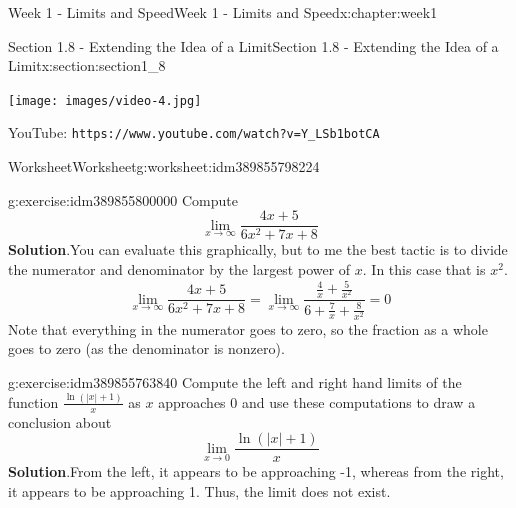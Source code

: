\documentclass[oneside,10pt,]{book}
\newcommand{\blocktitlefont}{\relax}
\newcommand{\mono}[1]{\texttt{#1}}
\numberwithin{equation}{section}
\newlength{\qrsize}
\newlength{\previewwidth}
\begin{document}
\begin{chapterptx}{Week 1 - Limits and Speed}{}{Week 1 - Limits and Speed}{}{}{x:chapter:week1}
\begin{sectionptx}{Section 1.8 - Extending the Idea of a Limit}{}{Section 1.8 - Extending the Idea of a Limit}{}{}{x:section:section1_8}
\begin{tcbraster}[raster columns=2, raster column skip=1pt, raster halign=center, raster force size=false, raster left skip=0pt, raster right skip=0pt]
\begin{tcolorbox}[previewstyle, width=\previewwidth]%
\texttt{[image: images/video-4.jpg]}%
\end{tcolorbox}%
\begin{tcolorbox}[qrstyle]%
{\hypersetup{urlcolor=black}}%
\end{tcolorbox}%
\begin{tcolorbox}[captionstyle]%
\small YouTube: \mono{https://www.youtube.com/watch?v=Y\_LSb1botCA}\end{tcolorbox}%
\end{tcbraster}%
%
%
\typeout{************************************************}
\typeout{************************************************}
%
\begin{worksheet-subsection}{Worksheet}{}{Worksheet}{}{}{g:worksheet:idm389855798224}
\begin{divisionexercise}{1}{}{}{g:exercise:idm389855800000}%
Compute%
\begin{equation*}
\lim_{x\to \infty} \frac{4x+5}{6x^2+7x+8}
\end{equation*}
%
\textbf{\blocktitlefont Solution}.\hypertarget{g:solution:idm389855800928}{}\quad{}You can evaluate this graphically, but to me the best tactic is to divide the numerator and denominator by the largest power of \(x\). In this case that is \(x^2\).%
\begin{equation*}
\lim_{x\to \infty} \frac{4x+5}{6x^2+7x+8} = \lim_{x\to \infty} \frac{\frac4x+\frac5{x^2}}{6+\frac7x+\frac8{x^2}} = 0 
\end{equation*}
Note that everything in the numerator goes to zero, so the fraction as a whole goes to zero (as the denominator is nonzero).%
\end{divisionexercise}%
\begin{divisionexercise}{2}{}{}{g:exercise:idm389855763840}%
Compute the left and right hand limits of the function \(\frac{\ln(|x|+1)}{x}\) as \(x\) approaches 0 and use these computations to draw a conclusion about%
\begin{equation*}
\lim_{x\to 0} \frac{\ln(|x|+1)}{x}
\end{equation*}
%
\textbf{\blocktitlefont Solution}.\hypertarget{g:solution:idm389855812592}{}\quad{}From the left, it appears to be approaching -1, whereas from the right, it appears to be approaching 1. Thus, the limit does not exist.%
\par

\end{divisionexercise}
\end{worksheet-subsection}
\end{sectionptx}
\end{chapterptx}
\end{document}
